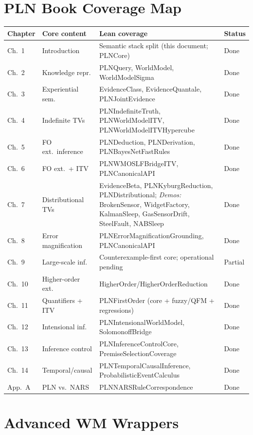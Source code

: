 \documentclass[11pt,openany]{report}
\begin{document}
\chapter{PLN Book Coverage Map}
\label{app:coverage-map}

\begin{longtable}{p{}p{}p{}p{}}
\textbf{Chapter} & \textbf{Core content} & \textbf{Lean coverage} & \textbf{Status} \\
\hline
Ch.\ 1 & Introduction & Semantic stack split (this document; PLNCore) & Done \\
Ch.\ 2 & Knowledge repr. & PLNQuery, WorldModel, WorldModelSigma & Done \\
Ch.\ 3 & Experiential sem. & EvidenceClass, EvidenceQuantale, PLNJointEvidence & Done \\
Ch.\ 4 & Indefinite TVs & PLNIndefiniteTruth, PLNWorldModelITV, PLNWorldModelITVHypercube & Done \\
Ch.\ 5 & FO ext.\ inference & PLNDeduction, PLNDerivation, PLNBayesNetFastRules & Done \\
Ch.\ 6 & FO ext.\ + ITV & PLNWMOSLFBridgeITV, PLNCanonicalAPI & Done \\
Ch.\ 7 & Distributional TVs & EvidenceBeta, PLNKyburgReduction, PLNDistributional; \emph{Demos:} BrokenSensor, WidgetFactory, KalmanSleep, GasSensorDrift, SteelFault, NABSleep & Done \\
Ch.\ 8 & Error magnification & PLNErrorMagnificationGrounding, PLNCanonicalAPI & Done \\
Ch.\ 9 & Large-scale inf. & Counterexample-first core; operational pending & Partial \\
Ch.\ 10 & Higher-order ext. & HigherOrder/HigherOrderReduction & Done \\
Ch.\ 11 & Quantifiers + ITV & PLNFirstOrder (core + fuzzy/QFM + regressions) & Done \\
Ch.\ 12 & Intensional inf. & PLNIntensionalWorldModel, SolomonoffBridge & Done \\
Ch.\ 13 & Inference control & PLNInferenceControlCore, PremiseSelectionCoverage & Done \\
Ch.\ 14 & Temporal/causal & PLNTemporalCausalInference, ProbabilisticEventCalculus & Done \\
App.\ A & PLN vs.\ NARS & PLNNARSRuleCorrespondence & Done \\
\hline
\end{longtable}


\chapter{Advanced WM Wrappers}
\label{app:advanced-wm}
\end{document}
